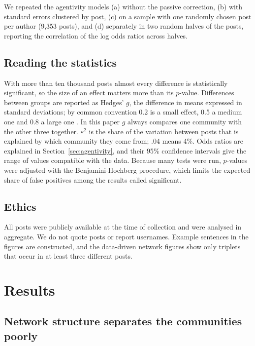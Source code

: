 \documentclass[11pt,a4paper]{article}
\begin{document}
We repeated the agentivity models (a) without the passive correction, (b) with standard errors clustered by post, (c) on a sample with one randomly chosen post per author (9,353 posts), and (d) separately in two random halves of the posts, reporting the correlation of the log odds ratios across halves.

\subsection{Reading the statistics}

With more than ten thousand posts almost every difference is statistically significant, so the size of an effect matters more than its $p$-value. Differences between groups are reported as Hedges' $g$, the difference in means expressed in standard deviations; by common convention 0.2 is a small effect, 0.5 a medium one and 0.8 a large one \citep{cohen1988}. In this paper $g$ always compares one community with the other three together. $\varepsilon^2$ is the share of the variation between posts that is explained by which community they come from; .04 means 4\%. Odds ratios are explained in Section~\ref{sec:agentivity}, and their 95\% confidence intervals give the range of values compatible with the data. Because many tests were run, $p$-values were adjusted with the Benjamini-Hochberg procedure, which limits the expected share of false positives among the results called significant.

\subsection{Ethics}

All posts were publicly available at the time of collection and were analysed in aggregate. We do not quote posts or report usernames. Example sentences in the figures are constructed, and the data-driven network figures show only triplets that occur in at least three different posts.

\section{Results}

\subsection{Network structure separates the communities poorly}
\end{document}
